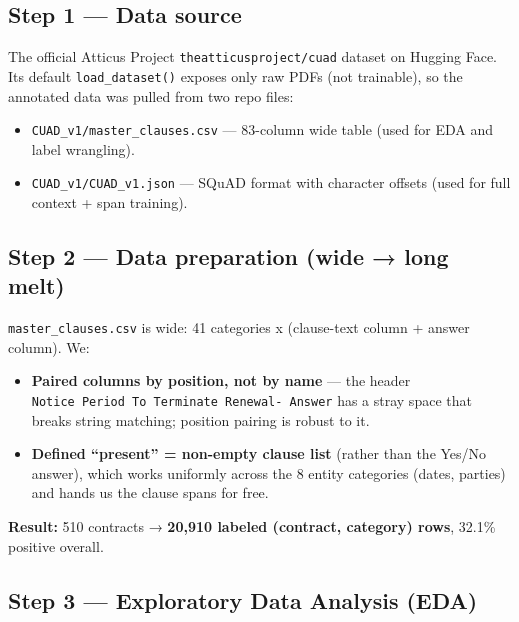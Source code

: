 \documentclass[
  10pt,
]{article}
\providecommand{\tightlist}{%
  \setlength{\itemsep}{0pt}\setlength{\parskip}{0pt}}
\begin{document}
\subsection{Step 1 --- Data source}

The official Atticus Project \texttt{theatticusproject/cuad} dataset on Hugging
Face. Its default \texttt{load\_dataset()} exposes only raw PDFs (not
trainable), so the annotated data was pulled from two repo files:

\begin{itemize}
\tightlist
\item
  \texttt{CUAD\_v1/master\_clauses.csv} --- 83-column wide table (used for EDA
  and label wrangling).
\item
  \texttt{CUAD\_v1/CUAD\_v1.json} --- SQuAD format with character offsets (used
  for full context + span training).
\end{itemize}

\subsection{Step 2 --- Data preparation (wide → long melt)}

\texttt{master\_clauses.csv} is wide: 41 categories x (clause-text column +
answer column). We:

\begin{itemize}
\tightlist
\item
  \textbf{Paired columns by position, not by name} --- the header
  \texttt{Notice\ Period\ To\ Terminate\ Renewal-\ Answer} has a stray space
  that breaks string matching; position pairing is robust to it.
\item
  \textbf{Defined ``present'' = non-empty clause list} (rather than the Yes/No
  answer), which works uniformly across the 8 entity categories (dates, parties)
  and hands us the clause spans for free.
\end{itemize}

\textbf{Result:} 510 contracts → \textbf{20,910 labeled (contract, category)
rows}, 32.1\% positive overall.

\subsection{Step 3 --- Exploratory Data Analysis (EDA)}
\end{document}
